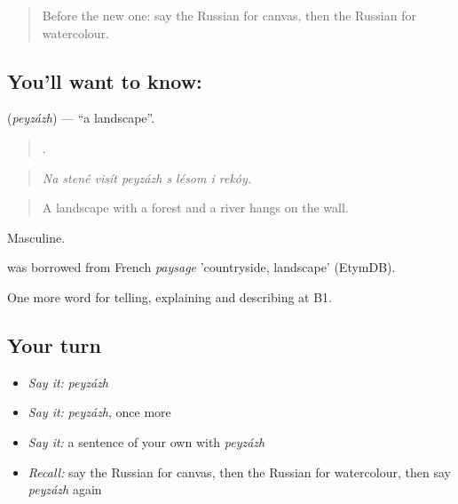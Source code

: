 \label{lesson:RU-C521-peyzazh}



\begin{quote}
Before the new one: say the Russian for canvas, then the Russian for watercolour.
\end{quote}

\subsection*{You'll want to know: }
\textbf{} (\emph{peyzázh}) — \textquotedblleft{}a landscape\textquotedblright{}.

\begin{quote}
       .
\end{quote}

\begin{quote}
\emph{Na stené visít peyzázh s lésom i rekóy.}
\end{quote}

\begin{quote}
A landscape with a forest and a river hangs on the wall.
\end{quote}

Masculine.

\begin{cousinweb}
\emph{} was borrowed from French \emph{paysage} 'countryside, landscape' (EtymDB).
\end{cousinweb}

\begin{grammarlens}[title={What you've built}]
One more word for telling, explaining and describing at B1.
\end{grammarlens}

\subsection*{Your turn}
\begin{itemize}
\raggedright
  \item \emph{Say it:} \emph{peyzázh}
  \item \emph{Say it:} \emph{peyzázh}, once more
  \item \emph{Say it:} a sentence of your own with \emph{peyzázh}
  \item \emph{Recall:} say the Russian for canvas, then the Russian for watercolour, then say \emph{peyzázh} again
\end{itemize}

